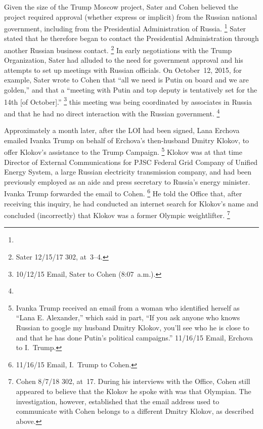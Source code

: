 Given the size of the Trump Moscow project, Sater and Cohen believed the project required approval (whether express or implicit) from the Russian national government, including from the Presidential Administration of Russia.%
\footnote{}
Sater stated that he therefore began to contact the Presidential Administration through another Russian business contact.%
\footnote{Sater 12/15/17 302, at~3--4.}
In early negotiations with the Trump Organization, Sater had alluded to the need for government approval and his attempts to set up meetings with Russian officials.
On October~12, 2015, for example, Sater wrote to Cohen that ``all we need is Putin on board and we are golden,'' and that a ``meeting with Putin and top deputy is tentatively set for the 14th [of October].''%
\footnote{10/12/15 Email, Sater to Cohen (8:07~a.m.).}
 this meeting was being coordinated by associates in Russia and that he had no direct interaction with the Russian government.%
\footnote{}

Approximately a month later, after the LOI had been signed, Lana Erchova emailed Ivanka Trump on behalf of Erchova's then-husband Dmitry Klokov, to offer Klokov's assistance to the Trump Campaign.%
\footnote{Ivanka Trump received an email from a woman who identified herself as ``Lana E. Alexander,'' which said in part, ``If you ask anyone who knows Russian to google my husband Dmitry Klokov, you'll see who he is close to and that he has done Putin's political campaigns.''
11/16/15 Email, Erchova to I.~Trump.}
Klokov was at that time Director of External Communications for PJSC Federal Grid Company of Unified Energy System, a large Russian electricity transmission company, and had been previously employed as an aide and press secretary to Russia's energy minister.
Ivanka Trump forwarded the email to Cohen.%
\footnote{11/16/15 Email, I.~Trump to Cohen.}
He told the Office that, after receiving this inquiry, he had conducted an internet search for Klokov's name and concluded (incorrectly) that Klokov was a former Olympic weightlifter.%
\footnote{Cohen 8/7/18 302, at~17.
During his interviews with the Office, Cohen still appeared to believe that the Klokov he spoke with was that Olympian.
The investigation, however, established that the email address used to communicate with Cohen belongs to a different Dmitry Klokov, as described above.}

